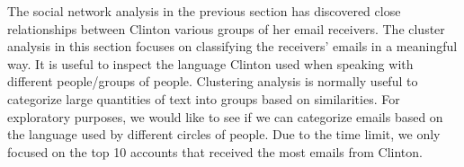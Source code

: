 The social network analysis in the previous section has discovered close relationships between Clinton various groups of her email receivers. The cluster analysis in this section focuses on classifying the receivers' emails in a meaningful way. It is useful to inspect the language Clinton used when speaking with different people/groups of people. Clustering analysis is normally useful to categorize large quantities of text into groups based on similarities. For exploratory purposes, we would like to see if we can categorize emails based on the language used by different circles of people. Due to the time limit, we only focused on the top 10 accounts that received the most emails from Clinton.

